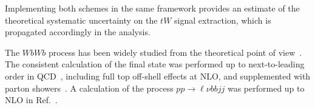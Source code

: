 Implementing both schemes in the same framework provides an estimate of the theoretical
systematic uncertainty on the $tW$ signal extraction, which is propagated accordingly in
the analysis.

The $WbWb$ process has been widely studied from the theoretical point
of view~\cite{White:2009yt,Frixione:2008yi,Hollik:2012rc,Demartin:2016axk,ATL-PHYS-PUB-2016-020}.
The consistent calculation of the \WbWb final state was performed up to next-to-leading order in QCD~\cite{Denner:2010jp},
including full top off-shell effects at NLO,
and supplemented with parton showers~\cite{Jezo:2016ujg,Jezo:2023rht}.
A calculation of the process \(pp\to\ell\nu b b j j\) was performed up to NLO in Ref.~\cite{Denner:2017kzu}.





